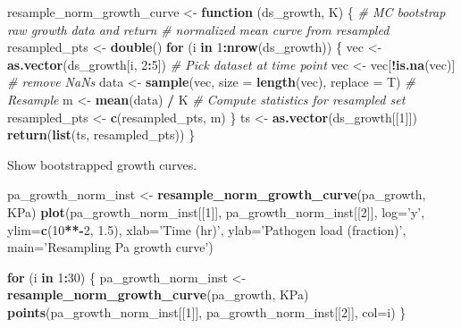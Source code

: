 \documentclass[]{article}
\newenvironment{Shaded}{\begin{snugshade}}{\end{snugshade}}
\newcommand{\KeywordTok}[1]{\textcolor[rgb]{0.13,0.29,0.53}{\textbf{#1}}}
\newcommand{\DataTypeTok}[1]{\textcolor[rgb]{0.13,0.29,0.53}{#1}}
\newcommand{\DecValTok}[1]{\textcolor[rgb]{0.00,0.00,0.81}{#1}}
\newcommand{\FloatTok}[1]{\textcolor[rgb]{0.00,0.00,0.81}{#1}}
\newcommand{\StringTok}[1]{\textcolor[rgb]{0.31,0.60,0.02}{#1}}
\newcommand{\CommentTok}[1]{\textcolor[rgb]{0.56,0.35,0.01}{\textit{#1}}}
\newcommand{\ControlFlowTok}[1]{\textcolor[rgb]{0.13,0.29,0.53}{\textbf{#1}}}
\newcommand{\OperatorTok}[1]{\textcolor[rgb]{0.81,0.36,0.00}{\textbf{#1}}}
\newcommand{\NormalTok}[1]{#1}
\begin{document}
\begin{Shaded}
\begin{Highlighting}[]
\NormalTok{resample_norm_growth_curve <-}\StringTok{ }\ControlFlowTok{function}\NormalTok{ (ds_growth, K) \{}
  \CommentTok{# MC bootstrap raw growth data and return}
  \CommentTok{# normalized mean curve from resampled }
\NormalTok{  resampled_pts <-}\StringTok{ }\KeywordTok{double}\NormalTok{()}
  \ControlFlowTok{for}\NormalTok{ (i }\ControlFlowTok{in} \DecValTok{1}\OperatorTok{:}\KeywordTok{nrow}\NormalTok{(ds_growth)) \{}
\NormalTok{    vec <-}\StringTok{ }\KeywordTok{as.vector}\NormalTok{(ds_growth[i, }\DecValTok{2}\OperatorTok{:}\DecValTok{5}\NormalTok{])  }\CommentTok{# Pick dataset at time point}
\NormalTok{    vec <-}\StringTok{ }\NormalTok{vec[}\OperatorTok{!}\KeywordTok{is.na}\NormalTok{(vec)]  }\CommentTok{# remove NaNs}
\NormalTok{    data <-}\StringTok{ }\KeywordTok{sample}\NormalTok{(vec, }\DataTypeTok{size =} \KeywordTok{length}\NormalTok{(vec), }\DataTypeTok{replace =}\NormalTok{ T) }\CommentTok{# Resample}
\NormalTok{    m <-}\StringTok{ }\KeywordTok{mean}\NormalTok{(data) }\OperatorTok{/}\StringTok{ }\NormalTok{K }\CommentTok{# Compute statistics for resampled set}
\NormalTok{    resampled_pts <-}\StringTok{ }\KeywordTok{c}\NormalTok{(resampled_pts, m)}
\NormalTok{  \}}
\NormalTok{  ts <-}\StringTok{ }\KeywordTok{as.vector}\NormalTok{(ds_growth[[}\DecValTok{1}\NormalTok{]])}
  \KeywordTok{return}\NormalTok{(}\KeywordTok{list}\NormalTok{(ts, resampled_pts))}
\NormalTok{\}}
\end{Highlighting}
\end{Shaded}

Show bootstrapped growth curves.

\begin{Shaded}
\begin{Highlighting}[]
\NormalTok{pa_growth_norm_inst <-}\StringTok{ }\KeywordTok{resample_norm_growth_curve}\NormalTok{(pa_growth, KPa)}
\KeywordTok{plot}\NormalTok{(pa_growth_norm_inst[[}\DecValTok{1}\NormalTok{]], pa_growth_norm_inst[[}\DecValTok{2}\NormalTok{]], }
     \DataTypeTok{log=}\StringTok{'y'}\NormalTok{, }
     \DataTypeTok{ylim=}\KeywordTok{c}\NormalTok{(}\DecValTok{10}\OperatorTok{**-}\DecValTok{2}\NormalTok{, }\FloatTok{1.5}\NormalTok{), }
     \DataTypeTok{xlab=}\StringTok{'Time (hr)'}\NormalTok{,}
     \DataTypeTok{ylab=}\StringTok{'Pathogen load (fraction)'}\NormalTok{,}
     \DataTypeTok{main=}\StringTok{'Resampling Pa growth curve'}\NormalTok{)}

\ControlFlowTok{for}\NormalTok{ (i }\ControlFlowTok{in} \DecValTok{1}\OperatorTok{:}\DecValTok{30}\NormalTok{) \{}
\NormalTok{  pa_growth_norm_inst <-}\StringTok{ }\KeywordTok{resample_norm_growth_curve}\NormalTok{(pa_growth, KPa)}
  \KeywordTok{points}\NormalTok{(pa_growth_norm_inst[[}\DecValTok{1}\NormalTok{]], pa_growth_norm_inst[[}\DecValTok{2}\NormalTok{]], }\DataTypeTok{col=}\NormalTok{i)}
\NormalTok{\}}
\end{Highlighting}
\end{Shaded}
\end{document}
